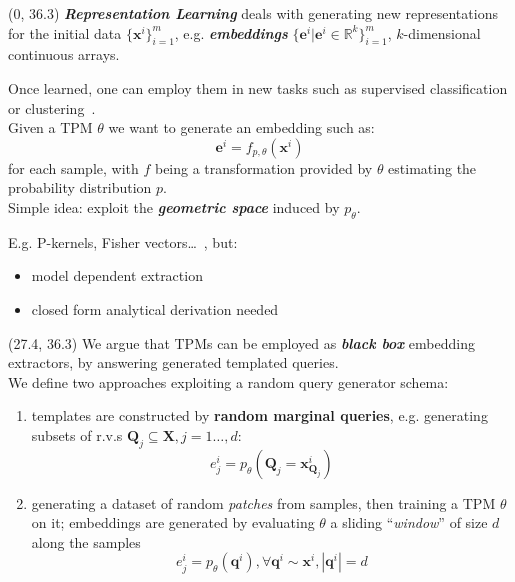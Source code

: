 \documentclass[final]{beamer}
\begin{document}
\begin{frame}{}
  \begin{textblock}{25.2}(0, 36.3)
    \small
    \textbf{\emph{Representation Learning}} deals with generating new
    representations for the initial data $\{\mathbf x^i\}_{i=1}^m$,
    e.g. \textbf{\emph{embeddings}}
    $\{\mathbf{e}^i|\mathbf{e}^i\in\mathbb{R}^{k}\}_{i=1}^m $,
    $k$-dimensional continuous arrays.\par
    Once learned, one can employ them in new tasks such as
    supervised classification or
    clustering~\parencite{Bengio2012}.\\[20pt]

    Given a TPM $\theta$ we want to generate an embedding such as:
    $$\mathbf{e}^{i}=f_{p,\theta}(\mathbf{x}^{i})$$
    for each sample, with $f$ being a transformation provided by $\theta$ estimating the
    probability distribution $p$.\\[20pt]

    Simple idea: exploit the \textbf{\emph{geometric space}} induced by $p_{\theta}$.\par
    E.g. P-kernels, Fisher vectors\dots~\parencite{Shawe-Taylor2004},
    but:
    \begin{itemize}
    \item model dependent extraction
      \item closed form analytical derivation needed
    \end{itemize}
    
  \end{textblock}
  
  \begin{textblock}{25.2}(27.4, 36.3)
    \small
    We argue that TPMs can be employed as \textbf{\emph{black box}} embedding
    extractors, by answering generated templated
    queries.\\[20pt]

    We define two approaches exploiting a random query generator
    schema:
    \begin{enumerate}[I]
    \item templates are constructed by \textbf{random marginal
      queries}, e.g. generating subsets of r.v.s $\mathbf{Q}_{j} \subseteq
    \mathbf{X}, j = 1\dots,d$:
    $$e_{j}^{i}=p_{\theta}(\mathbf{Q}_{j}=\mathbf{x}^{i}_{\mathbf{Q}_{j}})$$
  \item generating a dataset of random \emph{patches} from samples,
    then training a TPM $\theta$ on it; embeddings are generated by evaluating $\theta$
    a sliding ``\emph{window}'' of size $d$ along the samples
    $$e_{j}^{i}=p_{\theta}(\mathbf{q}^{i}),\forall \mathbf{q}^{i}\sim \mathbf{x}^{i}, |\mathbf{q}^{i}|=d$$
  \end{enumerate}\bigskip


\end{textblock}
\end{frame}
\end{document}
